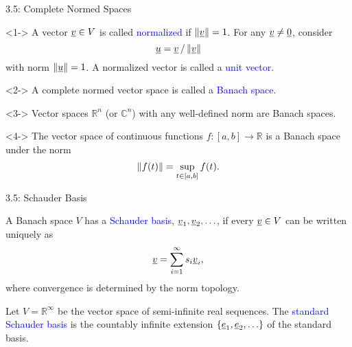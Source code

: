 \documentclass[10pt,english,aspectratio=169,handout]{beamer}
\begin{document}
\begin{frame}{3.5: Complete Normed Spaces}

\begin{definition}<1->
A vector $\underline{v} \in V$ is called \textcolor{blue}{normalized} if $\left\| \underline{v} \right\| = 1$.
For any $\underline{v} \neq \underline{0}$, consider \vspace{-2mm}
\begin{equation*}
\underline{u} = \underline{v}\, / \left\| \underline{v} \right\|
\end{equation*}
with norm $\left\| \underline{u} \right\| = 1$.
A normalized vector is called a \textcolor{blue}{unit vector}.
\end{definition}

\begin{definition}<2->
A complete normed vector space is called a \textcolor{blue}{Banach space}.
\end{definition}

\begin{example}<3->
Vector spaces $\mathbb{R}^n$ (or $\mathbb{C}^n$) with any well-defined norm are Banach spaces.
\end{example}

\begin{example}<4->
The vector space of continuous functions $f \colon [a,b] \to \mathbb{R}$ is a Banach space under the norm \vspace{-2.5mm}
\[ \left\| f(t) \right\| = \sup_{t\in [a,b]} f(t). \vspace*{-0.5mm}\]
\end{example}

\end{frame}

\begin{frame}{3.5: Schauder Basis}

\begin{definition}
A Banach space $V$ has a \textcolor{blue}{Schauder basis}, $\underline{v}_1, \underline{v}_2, \ldots$, if every $\underline{v} \in V$ can be written uniquely as
\[ \underline{v} = \sum_{i=1}^\infty s_i \underline{v}_i, \]
where convergence is determined by the norm topology.
\end{definition}

\begin{example}
Let $V = \mathbb{R}^\infty$ be the vector space of semi-infinite real sequences.
The \textcolor{blue}{standard Schauder basis} is the countably infinite extension $\{\underline{e}_1 ,\underline{e}_2, \ldots \}$ of the standard basis.
\end{example}


\end{frame}
\end{document}
